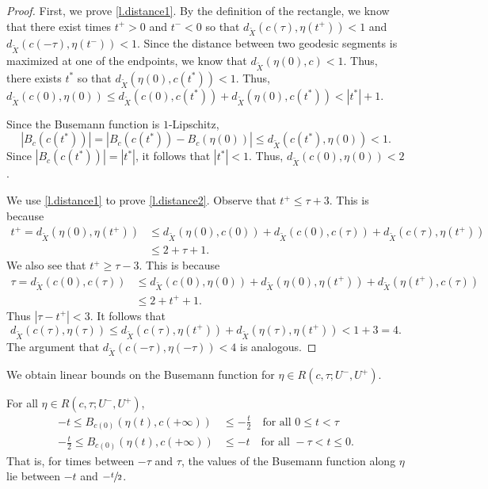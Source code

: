 \begin{proof}

First, we prove \eqref{l.distance1}. By the definition of the rectangle, we know that there exist times $t^+>0$ and $t^-<0$ so that $d_{\tilde X}(c(\tau), \eta(t^+))<1$ and $d_{\tilde X}(c(-\tau), \eta(t^-))<1$. Since the distance between two geodesic segments is maximized at one of the endpoints, we know that $d_{\tilde X}(\eta(0), c)<1$. Thus, there exists $t^\ast$ so that $d_{\tilde X}(\eta(0), c(t^\ast))<1$. Thus, $d_{\tilde X}(c(0), \eta(0)) \leq d_{\tilde X}(c(0), c(t^\ast))+ d_{\tilde X}(\eta(0), c(t^\ast)) < |t^\ast|+1$.

Since the Busemann function is $1$-Lipschitz,
\[|B_c(c(t^\ast))| = |B_c(c(t^\ast))- B_c(\eta(0))| \leq d_{\tilde X}(c(t^\ast), \eta(0)) <1.\]
Since $|B_c(c(t^\ast))| = |t^\ast|$, it follows that $|t^\ast|<1$. Thus, $d_{\tilde X}(c(0), \eta(0))<2$.

We use \eqref{l.distance1} to prove \eqref{l.distance2}. Observe that $t^+\leq \tau+3$. This is because
\begin{align*}
t^+=d_{\tilde X}(\eta(0), \eta(t^+)) &\leq d_{\tilde X}(\eta(0), c(0))+ d_{\tilde X}(c(0), c(\tau)) + d_{\tilde X}(c(\tau), \eta(t^+)) \\
& \leq 2+\tau +1.
\end{align*}
We also see that $t^+\geq \tau-3$. This is because
\begin{align*}
\tau = d_{\tilde X}(c(0), c(\tau)) & \leq d_{\tilde X}(c(0), \eta(0))+d_{\tilde X}(\eta(0), \eta(t^+))+d_{\tilde X}(\eta(t^+), c(\tau)) \\
& \leq 2 + t^+ +1.
\end{align*}
Thus $|\tau-t^+| <3$. It follows that
\[d_{\tilde X}(c(\tau), \eta(\tau)) \leq d_{\tilde X}(c (\tau), \eta(t^+))+ d_{\tilde X}(\eta(\tau), \eta(t^+))< 1+ 3 = 4.\]
The argument that $d_{\tilde X}(c(-\tau), \eta(-\tau))<4$ is analogous.
\end{proof}

We obtain linear bounds on the Busemann function for $\eta \in R(c, \tau; U^-,U^+)$.

\begin{lem}\label{lem:linear}
For all $\eta \in R(c, \tau; U^-, U^+)$,
\begin{align*}
-t \leq B_{c(0)}(\eta(t),c(+\infty)) &\leq - \frac{t}{2} \quad\mbox{for all } 0\leq t<\tau\\
\tag*{and}
-\frac{t}{2} \leq B_{c(0)}(\eta(t),c(+\infty)) &\leq - t \quad\mbox{for all } -\tau < t \leq 0.
\end{align*}
That is, for times between $-\tau$ and $\tau$, the values of the Busemann function along $\eta$ lie between $-t$ and $-\sfrac{t}{2}$.
\end{lem}

